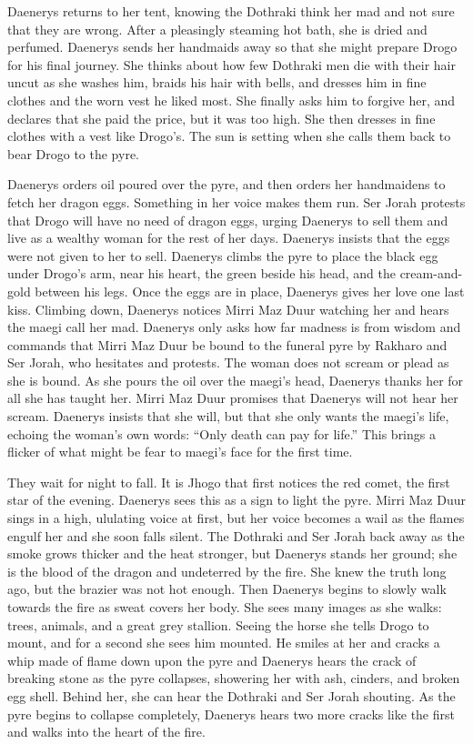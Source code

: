 Daenerys returns to her tent, knowing the Dothraki think her mad and not sure that they are wrong. After a pleasingly steaming hot bath, she is dried and perfumed. Daenerys sends her handmaids away so that she might prepare Drogo for his final journey. She thinks about how few Dothraki men die with their hair uncut as she washes him, braids his hair with bells, and dresses him in fine clothes and the worn vest he liked most. She finally asks him to forgive her, and declares that she paid the price, but it was too high. She then dresses in fine clothes with a vest like Drogo’s. The sun is setting when she calls them back to bear Drogo to the pyre.

Daenerys orders oil poured over the pyre, and then orders her handmaidens to fetch her dragon eggs. Something in her voice makes them run. Ser Jorah protests that Drogo will have no need of dragon eggs, urging Daenerys to sell them and live as a wealthy woman for the rest of her days. Daenerys insists that the eggs were not given to her to sell. Daenerys climbs the pyre to place the black egg under Drogo's arm, near his heart, the green beside his head, and the cream-and-gold between his legs. Once the eggs are in place, Daenerys gives her love one last kiss. Climbing down, Daenerys notices Mirri Maz Duur watching her and hears the maegi call her mad. Daenerys only asks how far madness is from wisdom and commands that Mirri Maz Duur be bound to the funeral pyre by Rakharo and Ser Jorah, who hesitates and protests. The woman does not scream or plead as she is bound. As she pours the oil over the maegi’s head, Daenerys thanks her for all she has taught her. Mirri Maz Duur promises that Daenerys will not hear her scream. Daenerys insists that she will, but that she only wants the maegi’s life, echoing the woman’s own words: “Only death can pay for life.” This brings a flicker of what might be fear to maegi’s face for the first time.

They wait for night to fall. It is Jhogo that first notices the red comet, the first star of the evening. Daenerys sees this as a sign to light the pyre. Mirri Maz Duur sings in a high, ululating voice at first, but her voice becomes a wail as the flames engulf her and she soon falls silent. The Dothraki and Ser Jorah back away as the smoke grows thicker and the heat stronger, but Daenerys stands her ground; she is the blood of the dragon and undeterred by the fire. She knew the truth long ago, but the brazier was not hot enough. Then Daenerys begins to slowly walk towards the fire as sweat covers her body. She sees many images as she walks: trees, animals, and a great grey stallion. Seeing the horse she tells Drogo to mount, and for a second she sees him mounted. He smiles at her and cracks a whip made of flame down upon the pyre and Daenerys hears the crack of breaking stone as the pyre collapses, showering her with ash, cinders, and broken egg shell. Behind her, she can hear the Dothraki and Ser Jorah shouting. As the pyre begins to collapse completely, Daenerys hears two more cracks like the first and walks into the heart of the fire.

